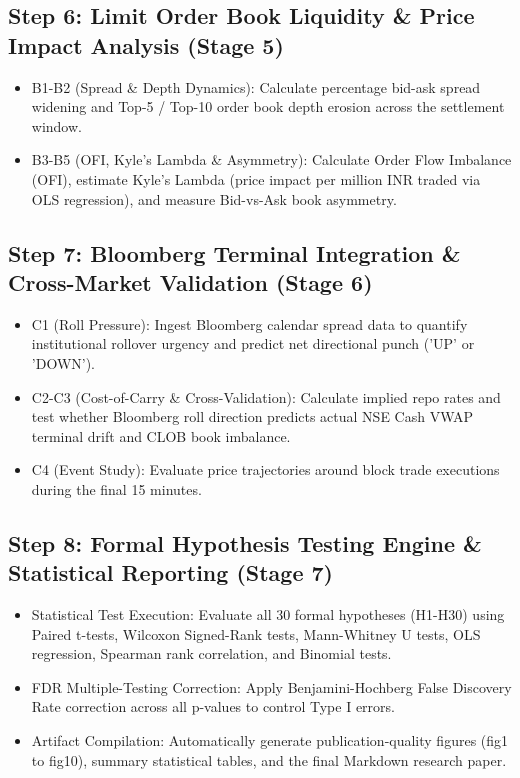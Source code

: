 \documentclass[11pt,a4paper]{article}
\begin{document}
\subsection*{Step 6: Limit Order Book Liquidity \& Price Impact Analysis (Stage 5)}
\begin{itemize}[noitemsep,topsep=2pt]
  \item B1-B2 (Spread \& Depth Dynamics): Calculate percentage bid-ask spread widening and Top-5 / Top-10 order book depth erosion across the settlement window.
  \item B3-B5 (OFI, Kyle's Lambda \& Asymmetry): Calculate Order Flow Imbalance (OFI), estimate Kyle's Lambda (price impact per million INR traded via OLS regression), and measure Bid-vs-Ask book asymmetry.
\end{itemize}
\vspace{0.15cm}
\subsection*{Step 7: Bloomberg Terminal Integration \& Cross-Market Validation (Stage 6)}
\begin{itemize}[noitemsep,topsep=2pt]
  \item C1 (Roll Pressure): Ingest Bloomberg calendar spread data to quantify institutional rollover urgency and predict net directional punch ('UP' or 'DOWN').
  \item C2-C3 (Cost-of-Carry \& Cross-Validation): Calculate implied repo rates and test whether Bloomberg roll direction predicts actual NSE Cash VWAP terminal drift and CLOB book imbalance.
  \item C4 (Event Study): Evaluate price trajectories around block trade executions during the final 15 minutes.
\end{itemize}
\vspace{0.15cm}
\subsection*{Step 8: Formal Hypothesis Testing Engine \& Statistical Reporting (Stage 7)}
\begin{itemize}[noitemsep,topsep=2pt]
  \item Statistical Test Execution: Evaluate all 30 formal hypotheses (H1-H30) using Paired t-tests, Wilcoxon Signed-Rank tests, Mann-Whitney U tests, OLS regression, Spearman rank correlation, and Binomial tests.
  \item FDR Multiple-Testing Correction: Apply Benjamini-Hochberg False Discovery Rate correction across all p-values to control Type I errors.
  \item Artifact Compilation: Automatically generate publication-quality figures (fig1 to fig10), summary statistical tables, and the final Markdown research paper.
\end{itemize}
\vspace{0.15cm}
\end{document}
